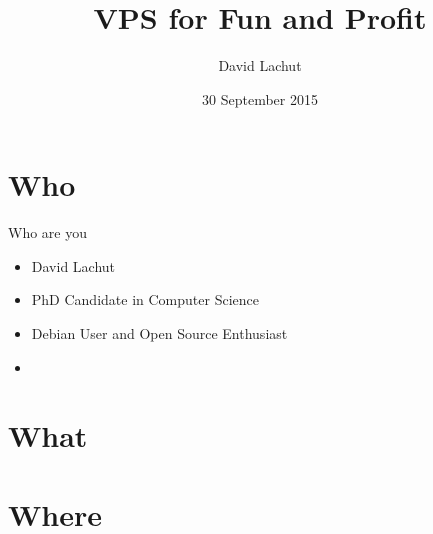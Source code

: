 \documentclass[presentation,aspectratio=169]{beamer}
\author{David Lachut}
\date{30 September 2015}
\title{VPS for Fun and Profit}
\begin{document}
\maketitle

\section{Who}
\label{sec-1}
\begin{frame}[label=sec-1-0-1]{Who are you}
\begin{itemize}
\item David Lachut
\item PhD Candidate in Computer Science
\item Debian User and Open Source Enthusiast
\item 
\end{itemize}
\end{frame}
\section{What}
\label{sec-2}

\section{Where}
\label{sec-3}

\section{}
\label{sec-4}
\end{document}
